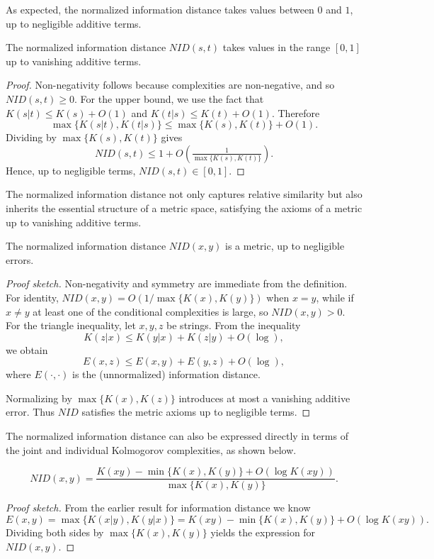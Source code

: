 As expected, the normalized information distance takes values between $0$ and $1$, up to negligible additive terms.

\begin{proposition}
\label{prop:ncd_between_zero_and_one}
The normalized information distance $NID(s, t)$ takes values in the range $[0, 1]$ up to vanishing additive terms.
\end{proposition}
\begin{proof}
Non-negativity follows because complexities are non-negative, and so $NID(s,t)\geq 0$. 
For the upper bound, we use the fact that $K(s|t) \leq K(s) + O(1)$ and $K(t|s)\leq K(t) + O(1)$. 
Therefore
\[
\max\{K(s|t),K(t|s)\} \leq \max\{K(s),K(t)\} + O(1).
\]
Dividing by $\max\{K(s),K(t)\}$ gives
\[
NID(s,t) \leq 1 + O\!\left(\tfrac{1}{\max\{K(s),K(t)\}}\right).
\]
Hence, up to negligible terms, $NID(s,t)\in [0,1]$.
\end{proof}

The normalized information distance not only captures relative similarity but also inherits the essential structure of a metric space, satisfying the axioms of a metric up to vanishing additive terms.

\begin{proposition}
The normalized information distance $NID(x, y)$ is a metric, up to negligible errors.
\end{proposition}
\begin{proof}[Proof sketch]
Non-negativity and symmetry are immediate from the definition. 
For identity, $NID(x,y)=O(1/\max\{K(x),K(y)\})$ when $x=y$, while if $x\neq y$ at least one of the conditional complexities is large, so $NID(x,y) > 0$. 
For the triangle inequality, let $x,y,z$ be strings. From the inequality
\[
K(z|x) \leq K(y|x) + K(z|y) + O(\log),
\]
we obtain
\[
E(x,z) \leq E(x,y) + E(y,z) + O(\log),
\]
where $E(\cdot,\cdot)$ is the (unnormalized) information distance.

Normalizing by $\max\{K(x),K(z)\}$ introduces at most a vanishing additive error. Thus $NID$ satisfies the metric axioms up to negligible terms.
\end{proof}

The normalized information distance can also be expressed directly in terms of the joint and individual Kolmogorov complexities, as shown below.

\begin{proposition}
\[
NID(x, y) = \frac{ K(xy) - \min\{ K(x), K(y) \} + O(\log K(xy)) }{ \max \{ K(x), K(y) \} }.
\]
\end{proposition}
\begin{proof}[Proof sketch]
From the earlier result for information distance we know
\[
E(x,y) = \max\{K(x|y),K(y|x)\} = K(xy) - \min\{K(x),K(y)\} + O(\log K(xy)).
\]
Dividing both sides by $\max\{K(x),K(y)\}$ yields the expression for $NID(x,y)$.
\end{proof}

